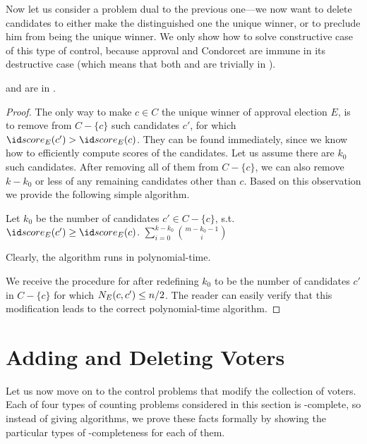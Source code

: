 Now let us consider a problem dual to the previous one---we now want to delete candidates to either make the distinguished one the unique winner, or to preclude him from being the unique winner.
We only show how to solve constructive case of this type of control, because approval and Condorcet are immune in its destructive case (which means that both  and  are trivially in \FPclass).

\begin{theorem} \label{th:acdcc}
	 and  are in \FPclass.
\end{theorem}

\begin{proof}
The only way to make $c\in C$ the unique winner of approval election $E$, is to remove from $C-\{c\}$ such candidates $c'$, for which $\score{E}(c')>\score{E}(c)$.
They can be found immediately, since we know how to efficiently compute scores of the candidates.
Let us assume there are $k_0$ such candidates.
After removing all of them from $C-\{c\}$, we can also remove $k-k_0$ or less of any remaining candidates other than $c$.
Based on this observation we provide the following simple algorithm.

\begin{codebox}
\li	Let $k_0$ be the number of candidates $c'\in C-\{c\}$\!, s.t.\ $\score{E}(c')\ge\score{E}(c)$. \label{apdcc:defining_k0}
\li	\Return $\sum_{i=0}^{k-k_0}\binom{m-k_0-1}{i}$ \label{apdcc:returning_result}
\end{codebox}

Clearly, the algorithm runs in polynomial-time.

We receive the procedure for  after redefining $k_0$ to be the number of candidates $c'$ in $C-\{c\}$ for which $N_{E}(c,c')\le n/2$.
The reader can easily verify that this modification leads to the correct polynomial-time algorithm.
\end{proof}

\section{Adding and Deleting Voters} \label{sec:acvot}

Let us now move on to the control problems that modify the collection of voters.
Each of four types of counting problems considered in this section is \sharpPclass-complete, so instead of giving algorithms, we prove these facts formally by showing the particular types of \sharpPclass-completeness for each of them.

